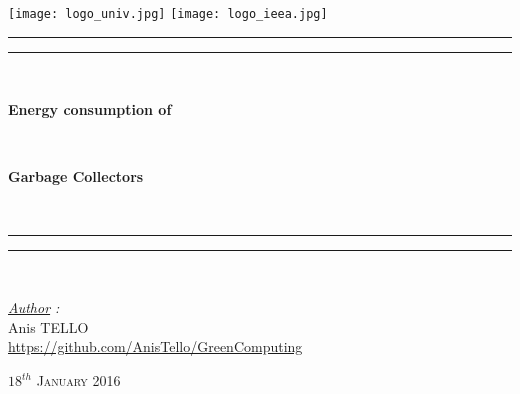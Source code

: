 \thispagestyle{cover}

\texttt{[image: logo\_univ.jpg]}
 \hfill \texttt{[image: logo\_ieea.jpg]} \\

\vspace*{15mm}

\begin{center}

	\vspace*{15mm}

	\rule[0.5ex]{\linewidth}{2pt}\vspace*{-\baselineskip}\vspace*{3.2pt}
	\rule[0.5ex]{\linewidth}{1pt}\\[\baselineskip]

		\begin{Huge} \textbf{Energy consumption of} \end{Huge}\\[4mm]
		\begin{Huge} \textbf{Garbage Collectors} \end{Huge}\\[4mm]
	\rule[0.5ex]{\linewidth}{1pt}\vspace*{-\baselineskip}\vspace{3.2pt}
	\rule[0.5ex]{\linewidth}{2pt}\\

	\vspace*{20mm}

	{\LARGE \textit{\underline{Author} :}}\\
	\vspace*{3mm}
	{\LARGE Anis TELLO}\\
	\url{https://github.com/AnisTello/GreenComputing}\\
	
	\vspace*{20mm}
	
	{\LARGE\textsc{$18^{th}$ January 2016}}
\end{center}